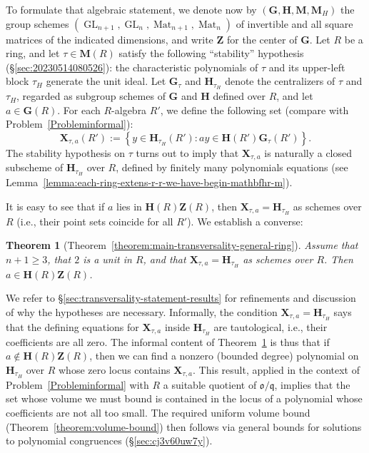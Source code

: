 \documentclass[reqno]{amsart}
\DeclareMathOperator{\Mat}{Mat}
\DeclareMathOperator{\GL}{GL}
\theoremstyle{plain} \newtheorem{theorem} {Theorem} \newtheorem{conjecture} {Conjecture} \newtheorem{corollary} [theorem] {Corollary} \newtheorem{proposition} [theorem] {Proposition} \newtheorem{fact} [theorem] {Fact}
\theoremstyle{definition} \newtheorem{definition} [theorem] {Definition}
\theoremstyle{itplain} %
\begin{document}
To formulate that algebraic statement, we denote now by $(\mathbf{G}, \mathbf{H}, \mathbf{M}, \mathbf{M}_H)$ the group schemes $(\GL_{n+1}, \GL_n, \Mat_{n+1}, \Mat_n)$ of invertible and all square matrices of the indicated dimensions, and write $\mathbf{Z}$ for the center of $\mathbf{G}$.  Let $R$ be a ring, and let $\tau \in \mathbf{M}(R)$ satisfy the following ``stability'' hypothesis (\S\ref{sec:20230514080526}): the characteristic polynomials of $\tau$ and its upper-left block $\tau_H$ generate the unit ideal.  Let $\mathbf{G}_\tau$ and $\mathbf{H}_{\tau_H}$ denote the centralizers of $\tau$ and $\tau_H$, regarded as subgroup schemes of $\mathbf{G}$ and $\mathbf{H}$ defined over $R$, and let $a \in \mathbf{G}(R)$.  For each $R$-algebra $R'$, we define the following set (compare with Problem~\ref{Probleminformal}):
\begin{equation*}
  \mathbf{X}_{\tau,a}(R') := \left\{ y \in \mathbf{H}_{\tau_H}(R') : a y \in \mathbf{H}(R') \mathbf{G}_{\tau}(R') \right\}.
\end{equation*}
The stability hypothesis on $\tau$ turns out to imply that $\mathbf{X}_{\tau,a}$ is naturally a closed subscheme of $\mathbf{H}_{\tau_H}$ over $R$, defined by finitely many polynomials equations (see Lemma~\ref{lemma:each-ring-extens-r-r-we-have-begin-mathbfhr-m}).

It is easy to see that if $a$ lies in $\mathbf{H}(R) \mathbf{Z}(R)$, then $\mathbf{X}_{\tau,a} = \mathbf{H}_{\tau_H}$ as schemes over $R$ (i.e., their point sets coincide for all $R'$).  We establish a converse:
\begin{theorem}[Theorem~\ref{theorem:main-transversality-general-ring}]\label{theorem:cj2dzotgu8}
  Assume that $n+1 \geq 3$, that $2$ is a unit in $R$, and that $\mathbf{X}_{\tau,a} = \mathbf{H}_{\tau_H}$ as schemes over $R$.  Then $a \in \mathbf{H}(R) \mathbf{Z}(R)$.
\end{theorem}
We refer to \S\ref{sec:transversality-statement-results} for refinements and discussion of why the hypotheses are necessary.  Informally, the condition $\mathbf{X}_{\tau,a} = \mathbf{H}_{\tau_H}$ says that the defining equations for $\mathbf{X}_{\tau,a}$ inside $\mathbf{H}_{\tau_H}$ are tautological, i.e., their coefficients are all zero.  The informal content of Theorem~\ref{theorem:cj2dzotgu8} is thus that if $a \notin \mathbf{H}(R) \mathbf{Z}(R)$, then we can find a nonzero (bounded degree) polynomial on $\mathbf{H}_{\tau_H}$ over $R$ whose zero locus contains $\mathbf{X}_{\tau,a}$.  This result, applied in the context of Problem~\ref{Probleminformal} with $R$ a suitable quotient of $\mathfrak{o}/\mathfrak{q}$, implies that the set whose volume we must bound is contained in the locus of a polynomial whose coefficients are not all too small.  The required uniform volume bound (Theorem~\ref{theorem:volume-bound}) then follows via general bounds for solutions to polynomial congruences (\S\ref{sec:cj3v60uw7y}).
\end{document}
